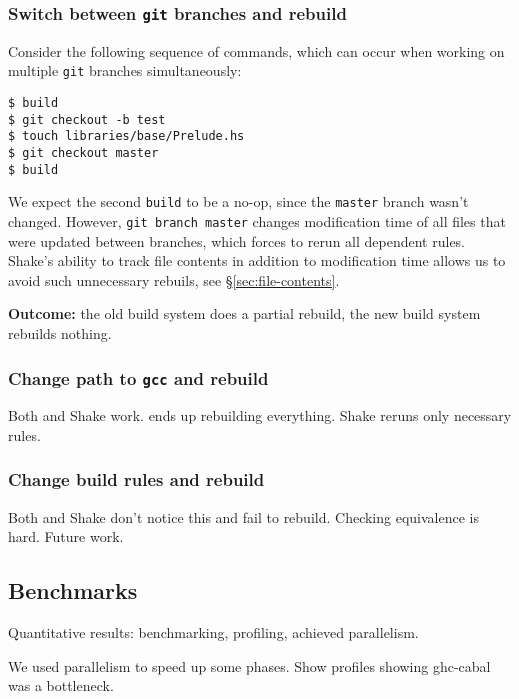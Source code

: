 \subsubsection{Switch between \texttt{git} branches and rebuild}
 
Consider the following sequence of commands, which can occur when working on
multiple \texttt{git} branches simultaneously:

\begin{lstlisting}
$ build
$ git checkout -b test
$ touch libraries/base/Prelude.hs
$ git checkout master
$ build
\end{lstlisting}

We expect the second \texttt{build} to be a no-op, since the \texttt{master}
branch wasn't changed. However, \texttt{git branch master} changes modification
time of all files that were updated between branches, which forces \make{} to
rerun all dependent rules. Shake's ability to track file contents in addition to
modification time allows us to avoid such unnecessary rebuils, see
\S\ref{sec:file-contents}.

\textbf{Outcome:} the old build system does a partial rebuild, the new build
system rebuilds nothing.
 
\subsubsection{Change path to \texttt{gcc} and rebuild}
 
Both \make{} and Shake work. \make{} ends up rebuilding everything. Shake reruns
only necessary rules.

\subsubsection{Change build rules and rebuild}
 
Both \make{} and Shake don't notice this and fail to rebuild. Checking
equivalence is hard. Future work.

\subsection{Benchmarks}


Quantitative results: benchmarking, profiling, achieved parallelism.

We used parallelism to speed up some phases. Show profiles showing ghc-cabal was
a bottleneck.

